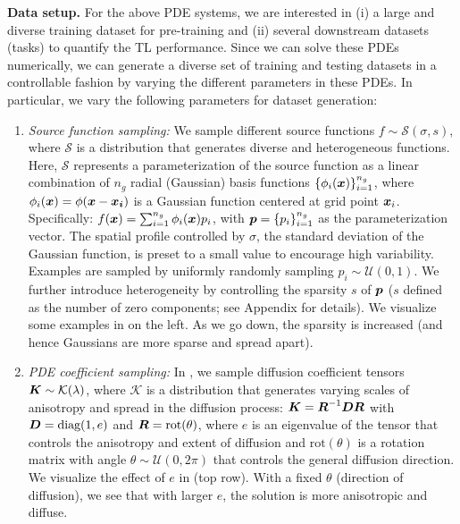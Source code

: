 \medskip
\noindent 
\textbf{Data setup.}
For the above PDE systems, we are interested in (i) a large and diverse training dataset for pre-training and (ii) several downstream datasets (tasks) to quantify the TL performance.
Since we can solve these PDEs numerically, we can generate a diverse set of training and testing datasets in a controllable fashion by varying the different parameters in these PDEs. In particular, we vary the following parameters for dataset generation:
\begin{enumerate}[leftmargin=5ex,nosep]
    \item \textit{Source function sampling:} We sample different source functions $f \sim \mathcal{S}(\sigma, s)$, where $\mathcal{S}$ is a distribution that generates diverse and heterogeneous functions.
    Here, $\mathcal{S}$ represents a parameterization of the source function as a linear combination of $n_g$ radial (Gaussian) basis functions $\{\phi_i(\boldsymbol{x})\}_{i=1}^{n_g}$, where $\phi_i(\boldsymbol{x}) = \phi(\boldsymbol{x} - \boldsymbol{x_i})$ is a Gaussian function centered at grid point $\boldsymbol{x}_i$. Specifically: $f(\boldsymbol{x}) = \sum_{i = 1}^{n_g} \phi_i(\boldsymbol{x}) p_i$, 
with $\boldsymbol{p} = \{p_i\}_{i=1}^{n_g}$ as the parameterization vector. 
The
spatial profile controlled by $\sigma$, the standard deviation of the Gaussian
function, is preset to a small value to encourage high variability. Examples are
sampled by uniformly randomly sampling $p_i \sim \mathcal{U}(0,1)$. 
We further introduce heterogeneity by controlling the sparsity $s$ of $\boldsymbol{p}$ ($s$ defined as the number of zero components; see Appendix  for details). We visualize some examples in 
on the left. As we go down, the sparsity is increased (and
hence Gaussians are more sparse and spread apart).
   \item \textit{PDE coefficient sampling:} 
   In \sysA{}, we sample diffusion coefficient  tensors $\boldsymbol{K} \sim \mathcal{K}(\lambda)$, where $\mathcal{K}$ is a distribution that generates 
   varying scales of anisotropy and spread in the diffusion process:
   $\boldsymbol{K} = \boldsymbol{R}^{-1}\boldsymbol{D}\boldsymbol{R}$ with $\boldsymbol{D} = \text{diag}(1, e)$ and $\boldsymbol{R} = \text{rot}(\theta)$, where $e$ is an eigenvalue of the tensor that controls the anisotropy and extent of diffusion and $\text{rot}(\theta)$ is a rotation matrix with angle $\theta \sim \mathcal{U}(0, 2\pi)$ that controls the general diffusion direction. 
   We visualize the effect of $e$ in  (top row). With a fixed $\theta$ (direction of diffusion), we see that with larger $e$, the solution is more anisotropic and diffuse. 

\end{enumerate}
